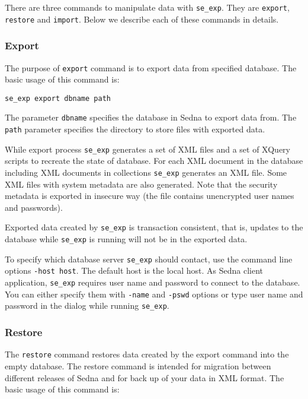 \documentclass[a4paper,12pt]{article}
\begin{document}
There are three commands to manipulate data with \verb!se_exp!. They are \verb!export!,
\verb!restore! and \verb!import!. Below we describe each of these commands in details.




\subsubsection*{Export}
The purpose of \verb!export! command is to export data from specified database. The basic usage 
of this command is:

\begin{verbatim}
se_exp export dbname path
\end{verbatim}

The parameter \verb!dbname! specifies the database in Sedna to export data from. The \verb!path!
parameter specifies the directory to store files with exported data. 

While export process \verb!se_exp! generates a set of XML files and a set of XQuery scripts to 
recreate the state of database. For each XML document in the database including XML documents in
collections \verb!se_exp! generates an XML file. Some XML files with system metadata are also
generated. Note that the security metadata is exported in insecure way (the file contains 
unencrypted user names and passwords).

Exported data created by \verb!se_exp! is transaction consistent, that is, updates to the database 
while \verb!se_exp! is running will not be in the exported data. 

To specify which database server \verb!se_exp! should contact, use the command line options 
\verb!-host host!. The default host is the local host. As Sedna client application, \verb!se_exp! 
requires user name and password to connect to the database. You can either specify them with 
\verb!-name! and \verb!-pswd! options or type user name and password in the dialog while 
running \verb!se_exp!.




\subsubsection*{Restore}

The \verb!restore! command restores data created by the export command into the empty database.
The restore command is intended for migration between different releases of Sedna and for back
up of your data in XML format. The basic usage of this command is:
\end{document}

